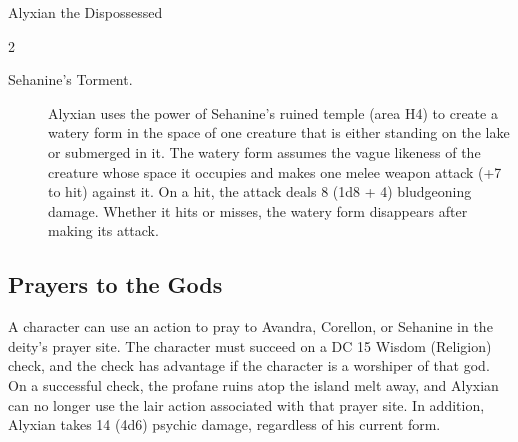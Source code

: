 \documentclass[10pt,a4paper,twoside,bg=print,twocolumn,openany,nodeprecatedcode]{dndbook}
\begin{document}
\begin{DndMonster}[float*=b,width=\textwidth + 8pt]{Alyxian the Dispossessed}
\begin{multicols}{2}
\begin{description}
\item[Sehanine's Torment.]
Alyxian uses the power of Sehanine's ruined temple (area H4) to create a watery form in the space of one creature that is either standing on the lake or submerged in it. The watery form assumes the vague likeness of the creature whose space it occupies and makes one melee weapon attack (+7 to hit) against it. On a hit, the attack deals 8 (1d8 + 4) bludgeoning damage. Whether it hits or misses, the watery form disappears after making its attack.

\end{description}

\subsection{Prayers to the Gods}
A character can use an action to pray to Avandra, Corellon, or Sehanine in the deity's prayer site. The character must succeed on a DC 15 Wisdom (Religion) check, and the check has advantage if the character is a worshiper of that god. On a successful check, the profane ruins atop the island melt away, and Alyxian can no longer use the lair action associated with that prayer site. In addition, Alyxian takes 14 (4d6) psychic damage, regardless of his current form.

\end{multicols}
\end{DndMonster}
\end{document}
